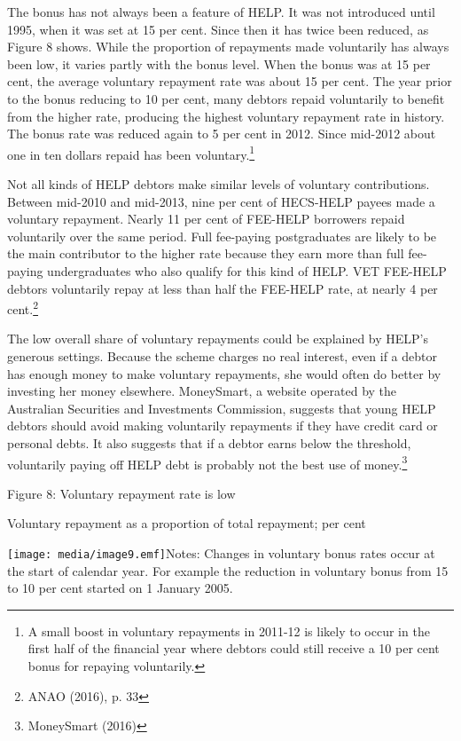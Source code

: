 \documentclass[]{book}
\begin{document}
The bonus has not always been a feature of HELP. It was not introduced until 1995, when it was set at 15 per cent. Since then it has twice been reduced, as Figure 8 shows. While the proportion of repayments made voluntarily has always been low, it varies partly with the bonus level. When the bonus was at 15 per cent, the average voluntary repayment rate was about 15 per cent. The year prior to the bonus reducing to 10 per cent, many debtors repaid voluntarily to benefit from the higher rate, producing the highest voluntary repayment rate in history. The bonus rate was reduced again to 5 per cent in 2012. Since mid-2012 about one in ten dollars repaid has been voluntary.\footnote{A small boost in voluntary repayments in 2011-12 is likely to occur in the first half of the financial year where debtors could still receive a 10 per cent bonus for repaying voluntarily.}

Not all kinds of HELP debtors make similar levels of voluntary contributions. Between mid-2010 and mid-2013, nine per cent of HECS-HELP payees made a voluntary repayment. Nearly 11 per cent of FEE-HELP borrowers repaid voluntarily over the same period. Full fee-paying postgraduates are likely to be the main contributor to the higher rate because they earn more than full fee-paying undergraduates who also qualify for this kind of HELP. VET FEE-HELP debtors voluntarily repay at less than half the FEE-HELP rate, at nearly 4 per cent.\footnote{ANAO (2016), p. 33}

The low overall share of voluntary repayments could be explained by HELP's generous settings. Because the scheme charges no real interest, even if a debtor has enough money to make voluntary repayments, she would often do better by investing her money elsewhere. MoneySmart, a website operated by the Australian Securities and Investments Commission, suggests that young HELP debtors should avoid making voluntarily repayments if they have credit card or personal debts. It also suggests that if a debtor earns below the threshold, voluntarily paying off HELP debt is probably not the best use of money.\footnote{MoneySmart (2016)}

\protect\hypertarget{_Ref333842548}{}{}Figure 8: Voluntary repayment rate is low

Voluntary repayment as a proportion of total repayment; per cent

\texttt{[image: media/image9.emf]}Notes: Changes in voluntary bonus rates occur at the start of calendar year. For example the reduction in voluntary bonus from 15 to 10 per cent started on 1 January 2005.
\end{document}
